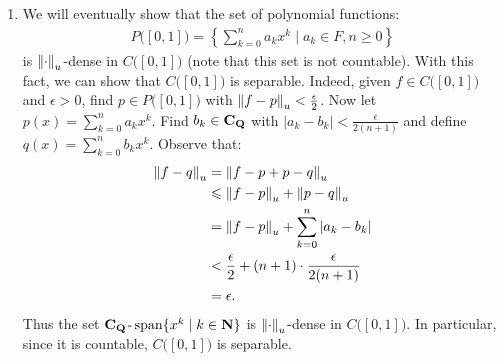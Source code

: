 \begin{example}
\begin{enumerate}[label = (\arabic*),itemsep=1pt,topsep=3pt]
            \item We will eventually show that the set of polynomial functions:
                \begin{equation*}
                \begin{split}
                    P\bigl([0,1]\bigr) = \left\{ \sum_{k = 0}^n a_kx^k \mid a_k \in F,n \geq 0 \right\}
                \end{split}
                \end{equation*}
            is $\lnorm \cdot \rnorm_u$-dense in $C\bigl([0,1]\bigr)$ (note that this set is not countable). With this fact, we can show that $C\bigl([0,1]\bigr)$ is separable. Indeed, given $f \in C\bigl([0,1]\bigr)$ and $\epsilon > 0$, find $p \in P\bigl([0,1]\bigr)$ with $\lnorm f - p \rnorm_u < \frac{\epsilon}{2}$. Now let $p(x) = \sum_{k = 0}^n a_k x^k$. Find $b_k \in \bfC_\bfQ$ with $|a_k - b_k| < \frac{\epsilon}{2(n+1)}$ and define $q(x) = \sum_{k = 0}^n b_k x^k$. Observe that:
                \begin{equation*}
                \begin{split}
                    \lnorm f - q \rnorm_u
                    & = \lnorm f-p + p-q \rnorm_u \\
                    & \leq \lnorm f-p \rnorm_u + \lnorm p-q \rnorm_u \\
                    & = \lnorm f-p \rnorm_u + \sum_{k = 0}^n|a_k - b_k| \\
                    & < \frac{\epsilon}{2} + (n+1)\cdot \frac{\epsilon}{2(n+1)} \\
                    & = \epsilon.
                \end{split}
                \end{equation*}
            Thus the set $\bfC_\bfQ\text{\h1-}\Span\{x^k \mid k \in \bfN\}$ is $\lnorm \cdot \rnorm_u$-dense in $C\bigl([0,1]\bigr)$. In particular, since it is countable, $C\bigl([0,1]\bigr)$ is separable.
        \end{enumerate}
    \end{example}

    

    \begin{center}
    \end{center}


